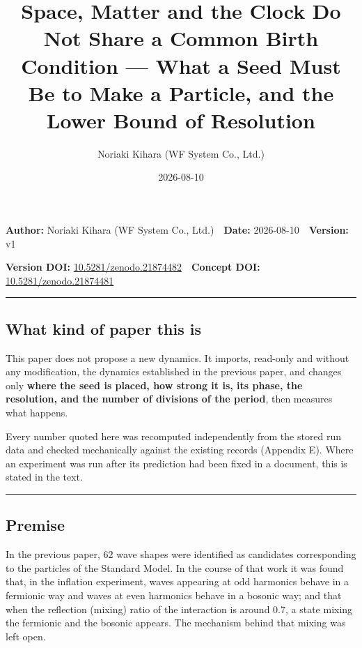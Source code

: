 \documentclass[
]{article}
\title{Space, Matter and the Clock Do Not Share a Common Birth Condition
--- What a Seed Must Be to Make a Particle, and the Lower Bound of
Resolution}
\author{Noriaki Kihara (WF System Co., Ltd.)}
\date{2026-08-10}
\begin{document}
\maketitle

\textbf{Author:} Noriaki Kihara (WF System Co., Ltd.)　\textbf{Date:}
2026-08-10　\textbf{Version:} v1

\textbf{Version DOI:}
\href{https://doi.org/10.5281/zenodo.21874482}{10.5281/zenodo.21874482}　\textbf{Concept
DOI:}
\href{https://doi.org/10.5281/zenodo.21874481}{10.5281/zenodo.21874481}

\begin{center}\rule{0.5\linewidth}{0.5pt}\end{center}

\subsection{What kind of paper this
is}\label{what-kind-of-paper-this-is}

This paper does not propose a new dynamics. It imports, read-only and
without any modification, the dynamics established in the previous
paper, and changes only \textbf{where the seed is placed, how strong it
is, its phase, the resolution, and the number of divisions of the
period}, then measures what happens.

Every number quoted here was recomputed independently from the stored
run data and checked mechanically against the existing records (Appendix
E). Where an experiment was run after its prediction had been fixed in a
document, this is stated in the text.

\begin{center}\rule{0.5\linewidth}{0.5pt}\end{center}

\subsection{Premise}\label{premise}

In the previous paper, 62 wave shapes were identified as candidates
corresponding to the particles of the Standard Model. In the course of
that work it was found that, in the inflation experiment, waves
appearing at odd harmonics behave in a fermionic way and waves at even
harmonics behave in a bosonic way; and that when the reflection (mixing)
ratio of the interaction is around 0.7, a state mixing the fermionic and
the bosonic appears. The mechanism behind that mixing was left open.
\end{document}
